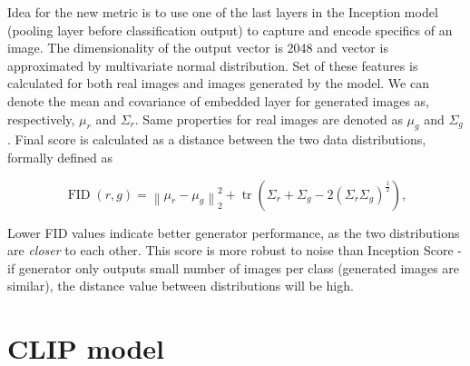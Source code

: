 \documentclass[11pt,a4paper,openany]{book}
\begin{document}
\noindent Idea for the new metric is to use one of the last layers in the Inception model (pooling layer before classification output) to capture and encode specifics of an image. The dimensionality of the output vector is 2048 and vector is approximated by multivariate normal distribution. Set of these features is calculated for both real images and images generated by the model. We can denote the mean and covariance of embedded layer for generated images as, respectively, $\mu_{r}$ and  $\Sigma_{r}$. Same properties for real images are denoted as $\mu_{g}$ and $\Sigma_{g}$. Final score is calculated as a distance between the two data distributions, formally defined as

\begin{equation}
\operatorname{FID}(r, g)=\left\|\mu_{r}-\mu_{g}\right\|_{2}^{2}+\operatorname{tr}\left(\Sigma_{r}+\Sigma_{g}-2\left(\Sigma_{r} \Sigma_{g}\right)^{\frac{1}{2}}\right),
\end{equation}

\noindent Lower FID values indicate better generator performance, as the two distributions are \textit{closer} to each other. This score is more robust to noise than Inception Score - if generator only outputs small number of images per class (generated images are similar), the distance value between distributions will be high.



\section{CLIP model}
\end{document}
